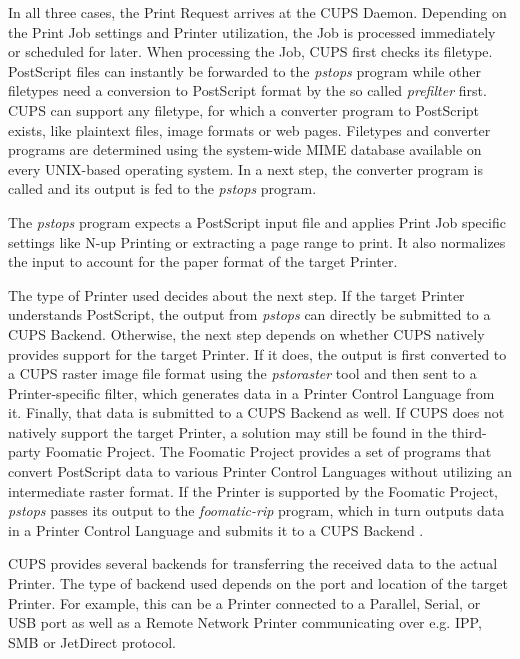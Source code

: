 In all three cases, the Print Request arrives at the \gls{CUPS} Daemon.
Depending on the Print Job settings and Printer utilization, the Job is processed immediately or scheduled for later.
When processing the Job, \gls{CUPS} first checks its filetype.
PostScript files can instantly be forwarded to the \emph{pstops} program while other filetypes need a conversion to PostScript format by the so called \emph{prefilter} first.
\gls{CUPS} can support any filetype, for which a converter program to PostScript exists, like plaintext files, image formats or web pages.
Filetypes and converter programs are determined using the system-wide \gls{MIME} database available on every UNIX-based operating system.
In a next step, the converter program is called and its output is fed to the \emph{pstops} program.

The \emph{pstops} program expects a PostScript input file and applies Print Job specific settings like N-up Printing or extracting a page range to print.
It also normalizes the input to account for the paper format of the target Printer.

The type of Printer used decides about the next step.
If the target Printer understands PostScript, the output from \emph{pstops} can directly be submitted to a \gls{CUPS} Backend.
Otherwise, the next step depends on whether \gls{CUPS} natively provides support for the target Printer.
If it does, the output is first converted to a \gls{CUPS} raster image file format using the \emph{pstoraster} tool and then sent to a Printer-specific filter, which generates data in a Printer Control Language from it.
Finally, that data is submitted to a \gls{CUPS} Backend as well.
If \gls{CUPS} does not natively support the target Printer, a solution may still be found in the third-party Foomatic Project.
The Foomatic Project provides a set of programs that convert PostScript data to various Printer Control Languages without utilizing an intermediate raster format.
If the Printer is supported by the Foomatic Project, \emph{pstops} passes its output to the \emph{foomatic-rip} program, which in turn outputs data in a Printer Control Language and submits it to a \gls{CUPS} Backend \cite{pfeifle2002cups}.

\gls{CUPS} provides several backends for transferring the received data to the actual Printer.
The type of backend used depends on the port and location of the target Printer.
For example, this can be a Printer connected to a Parallel, Serial, or USB port as well as a Remote Network Printer communicating over e.g. \gls{IPP}, \gls{SMB} or JetDirect protocol.


